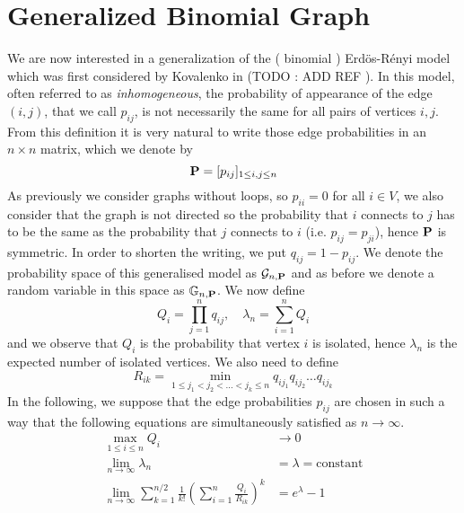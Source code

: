 \section{Generalized Binomial Graph}
We are now interested in a generalization of the ( binomial ) Erd\"os-R\'enyi model which was first considered by Kovalenko in (TODO : ADD REF ).
In this model, often referred to as \emph{inhomogeneous}, the probability of appearance of the edge $(i,j)$, that we call $p_{ij}$, is not necessarily the same for all pairs of vertices $i,j$.
\newline
From this definition it is very natural to write those edge probabilities in an $n\times n$ matrix, which we denote by
\begin{equation}
	\bold{P} = [p_{ij}]_{1\leq i,j \leq n}
\end{equation}
As previously we consider graphs without loops, so $p_{ii} = 0$ for all $i \in V$, we also consider that the graph is not directed so the probability that $i$ connects to $j$ has to be the same as the probability that $j$ connects to $i$ (i.e. $p_{ij} = p_{ji}$), hence $\bold{P}$ is symmetric.
In order to shorten the writing, we put $q_{ij} = 1 - p_{ij}$.
\newline
We denote the probability space of this generalised model as $\mathcal{G}_{n,\bold{P}}$ and as before we denote a random variable in this space as $\mathbb{G}_{n,\bold{P}}$.
\newline
We now define
\begin{equation}
	Q_i = \prod_{j=1}^n q_{ij}, \quad \lambda_n = \sum_{i=1}^nQ_i
\end{equation}
and we observe that $Q_i$ is the probability that vertex $i$ is isolated, hence $\lambda_n$ is the expected number of isolated vertices.
\newline
We also need to define
\begin{equation}
	R_{ik} = \min_{1\leq j_1<j_2< \ldots <j_k\leq n} q_{ij_1}q_{ij_2}\ldots q_{ij_k}
\end{equation}
In the following, we suppose that the edge probabilities $p_{ij}$ are chosen in such a way that the following equations are simultaneously satisfied as $n\to \infty$.
\begin{align}
	\max_{1\leq i \leq n} Q_i &\to 0 \label{eq:C1}\\
	\lim_{n \to \infty} \lambda_n &= \lambda = \text{constant} \label{eq:C2} \\
	\lim_{n\to \infty} \sum_{k=1}^{n/2} \frac{1}{k!}(\sum_{i=1}^n \frac{Q_i}{R_{ik}})^k &= e^{\lambda} - 1 \label{eq:C3}
\end{align}
